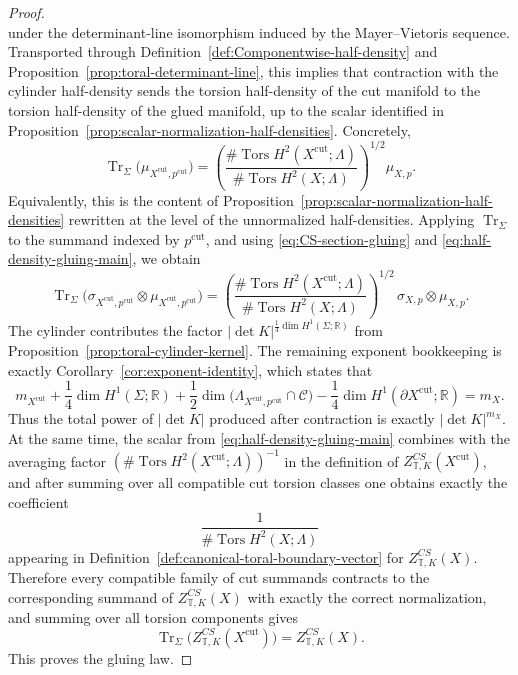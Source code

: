 \documentclass[12pt]{amsart}
\numberwithin{equation}{section}
\begin{document}
\begin{proof}
\begin{equation}
\end{equation}
under the determinant-line isomorphism induced by the Mayer--Vietoris sequence. Transported through
Definition~\ref{def:Componentwise-half-density} and Proposition~\ref{prop:toral-determinant-line}, this implies
that contraction with the cylinder half-density sends the torsion half-density of the cut manifold to the
torsion half-density of the glued manifold, up to the scalar identified in
Proposition~\ref{prop:scalar-normalization-half-densities}. Concretely,
\begin{equation}\label{eq:half-density-gluing-main}
\operatorname{Tr}_{\Sigma}\!\bigl(\mu_{X^{\mathrm{cut}},p^{\mathrm{cut}}}\bigr)
=
\left(
\frac{\#\operatorname{Tors}H^2(X^{\mathrm{cut}};\Lambda)}
     {\#\operatorname{Tors}H^2(X;\Lambda)}
\right)^{1/2}
\mu_{X,p}.
\end{equation}
Equivalently, this is the content of Proposition~\ref{prop:scalar-normalization-half-densities} rewritten at the level of the
unnormalized half-densities. Applying \(\operatorname{Tr}_{\Sigma}\) to the summand indexed by \(p^{\mathrm{cut}}\), and using
\eqref{eq:CS-section-gluing} and \eqref{eq:half-density-gluing-main}, we obtain
\[
\operatorname{Tr}_{\Sigma}\!\bigl(
\sigma_{X^{\mathrm{cut}},p^{\mathrm{cut}}}\otimes
\mu_{X^{\mathrm{cut}},p^{\mathrm{cut}}}
\bigr)
=
\left(
\frac{\#\operatorname{Tors}H^2(X^{\mathrm{cut}};\Lambda)}
     {\#\operatorname{Tors}H^2(X;\Lambda)}
\right)^{1/2}
\,
\sigma_{X,p}\otimes \mu_{X,p}.
\]
The cylinder contributes the factor $|\det K|^{\frac14 \dim H^1(\Sigma;\mathbb R)}$ from Proposition~\ref{prop:toral-cylinder-kernel}. The remaining exponent bookkeeping is exactly
Corollary~\ref{cor:exponent-identity}, which states that
\begin{equation}\label{eq:mx-bookkeeping}
m_{X^{\mathrm{cut}}}
+\frac14\dim H^1(\Sigma;\mathbb R)
+\frac12\dim\bigl(\Lambda_{X^{\mathrm{cut}},p^{\mathrm{cut}}}\cap \mathcal C\bigr)
-\frac14\dim H^1(\partial X^{\mathrm{cut}};\mathbb R)
=
m_X.
\end{equation}
Thus the total power of $|\det K|$ produced after contraction is exactly $|\det K|^{m_X}$. At the same time, the scalar from \eqref{eq:half-density-gluing-main} combines with the averaging factor
$(\#\operatorname{Tors}H^2(X^{\mathrm{cut}};\Lambda))^{-1}$
in the definition of \(Z^{CS}_{\mathbb T,K}(X^{\mathrm{cut}})\), and after summing over all compatible
cut torsion classes one obtains exactly the coefficient
\[
\frac{1}{\#\operatorname{Tors}H^2(X;\Lambda)}
\]
appearing in Definition~\ref{def:canonical-toral-boundary-vector} for \(Z^{CS}_{\mathbb T,K}(X)\). Therefore every compatible family of cut summands contracts to the corresponding summand of
\(Z^{CS}_{\mathbb T,K}(X)\) with exactly the correct normalization, and summing over all torsion components
gives
\[
\operatorname{Tr}_{\Sigma}\!\bigl(Z^{CS}_{\mathbb T,K}(X^{\mathrm{cut}})\bigr)
=
Z^{CS}_{\mathbb T,K}(X).
\]
This proves the gluing law.
\end{proof}
\end{document}
